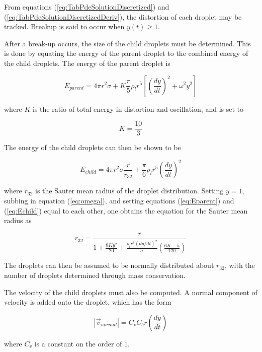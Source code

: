 \documentclass[12pt]{article}
\begin{document}
From equations (\ref{eq:TabPdeSolutionDiscretized}) and (\ref{eq:TabPdeSolutionDiscretizedDeriv}), the distortion of each droplet may be tracked. Breakup is said to occur when $y(t) \geq 1$.

After a break-up occurs, the size of the child droplets must be determined. This is done by equating the energy of the parent droplet to the combined energy of the child droplets. The energy of the parent droplet is

\begin{equation}\label{eq:Eparent}
E_{parent} = 4\pi r^{2}\sigma + K\frac{\pi}{5}\rho_{l}r^{5}\left[\left(\frac{dy}{dt}\right)^{2} + \omega^{2}y^{2}\right]
\end{equation}

where $K$ is the ratio of total energy in distortion and oscillation, and is set to

\begin{equation}
K = \frac{10}{3}
\end{equation}

The energy of the child droplets can then be shown to be

\begin{equation}\label{eq:Echild}
E_{child} = 4\pi r^{2}\sigma\frac{r}{r_{32}} + \frac{\pi}{6}\rho_{l}r^{5}\left(\frac{dy}{dt}\right)^{2}
\end{equation}

where $r_{32}$ is the Sauter mean radius of the droplet distribution. Setting $y=1$, subbing in equation (\ref{eq:omega}), and setting equations (\ref{eq:Eparent}) and (\ref{eq:Echild}) equal to each other, one obtains the equation for the Sauter mean radius as

\begin{equation}
r_{32} = \frac{r}{1 + \frac{8Ky^{2}}{20} + \frac{\rho_{l}r^{3}(dy/dt)^{2}}{\sigma}\left(\frac{6K-5}{120}\right)}
\end{equation}

The droplets can then be assumed to be normally distributed about $r_{32}$, with the number of droplets determined through mass conservation. 

The velocity of the child droplets must also be computed. A normal component of velocity is added onto the droplet, which has the form

\begin{equation}
|\vec{v}_{normal}| = C_{v}C_{b}r\left(\frac{dy}{dt}\right)
\end{equation} 

where $C_{v}$ is a constant on the order of $1$.
\end{document}
